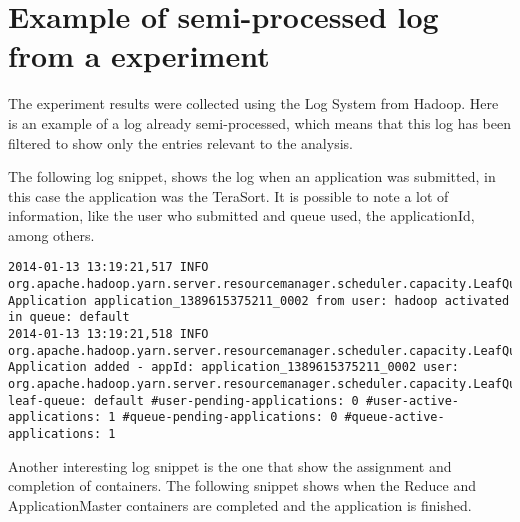 \chapter{Example of semi-processed log from a experiment}
\label{chap:logs}

The experiment results were collected using the Log System from Hadoop. Here is an example of a log already semi-processed, which means that this log has been filtered to show only the entries relevant to the analysis.

The following log snippet, shows the log when an application was submitted, in this case the application was the TeraSort. It is possible to note a lot of information, like the user who submitted and queue used, the applicationId, among others.

\lstset{language=Java,
             basicstyle=\footnotesize,
             numbers=left,
             extendedchars=\true
             showspaces = false,
             numberstyle=\footnotesize,
             frame=shadowbox,
             breaklines = true}

\begin{lstlisting}
2014-01-13 13:19:21,517 INFO org.apache.hadoop.yarn.server.resourcemanager.scheduler.capacity.LeafQueue: Application application_1389615375211_0002 from user: hadoop activated in queue: default
2014-01-13 13:19:21,518 INFO org.apache.hadoop.yarn.server.resourcemanager.scheduler.capacity.LeafQueue: Application added - appId: application_1389615375211_0002 user: org.apache.hadoop.yarn.server.resourcemanager.scheduler.capacity.LeafQueue$User@5673e296, leaf-queue: default #user-pending-applications: 0 #user-active-applications: 1 #queue-pending-applications: 0 #queue-active-applications: 1
\end{lstlisting}

Another interesting log snippet is the one that show the assignment and completion of containers. The following snippet shows when the Reduce and ApplicationMaster containers are completed and the application is finished.

